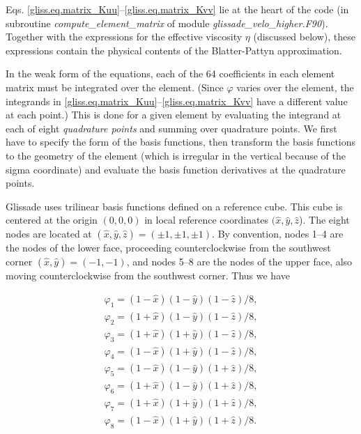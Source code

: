 Eqs. \eqref{gliss.eq.matrix_Kuu}--\eqref{gliss.eq.matrix_Kvv} lie at the heart of the code 
(in subroutine \textit{compute\_element\_matrix} of module \textit{glissade\_velo\_higher.F90}).
Together with the expressions for the effective viscosity $\eta$ (discussed below),
these expressions contain the physical contents of the Blatter-Pattyn approximation. 

In the weak form of the equations, each of the 64 coefficients in each
element matrix must be integrated over the element.  (Since $\varphi$ varies over the element,
the integrands in \eqref{gliss.eq.matrix_Kuu}--\eqref{gliss.eq.matrix_Kvv} 
have a different value at each point.)  
This is done for a given element by evaluating the integrand at each of 
eight \textit{quadrature points} and summing over quadrature points.
We first have to specify the form of the basis functions, then transform the basis functions to
the geometry of the element (which is irregular in the vertical because of the sigma
coordinate) and evaluate the basis function derivatives at the quadrature points.

Glissade uses trilinear basis functions defined on a reference cube.  
This cube is centered at the origin $(0,0,0)$ in local reference coordinates 
$(\hat{x}, \hat{y}, \hat{z}$). 
The eight nodes are located at $(\hat{x}, \hat{y}, \hat{z}) = (\pm 1, \pm 1, \pm 1)$.
By convention, nodes 1--4 are the nodes of the lower face, proceeding counterclockwise
from the southwest corner $(\hat{x}, \hat{y}) = (-1, -1)$, and nodes 5--8 are the nodes
of the upper face, also moving counterclockwise from the southwest corner.
Thus we have

\begin{equation}
  \label{gliss.eq.basis_functions}
  \begin{matrix}
    {{\varphi }_{1}}=(1-\hat{x})(1-\hat{y})(1-\hat{z})/8,  \\[3pt]
    {{\varphi }_{2}}=(1+\hat{x})(1-\hat{y})(1-\hat{z})/8,  \\[3pt]
    {{\varphi }_{3}}=(1+\hat{x})(1+\hat{y})(1-\hat{z})/8,  \\[3pt]
    {{\varphi }_{4}}=(1-\hat{x})(1+\hat{y})(1-\hat{z})/8,  \\[3pt]
    {{\varphi }_{5}}=(1-\hat{x})(1-\hat{y})(1+\hat{z})/8,  \\[3pt]
    {{\varphi }_{6}}=(1+\hat{x})(1-\hat{y})(1+\hat{z})/8,  \\[3pt]
    {{\varphi }_{7}}=(1+\hat{x})(1+\hat{y})(1+\hat{z})/8,  \\[3pt]
    {{\varphi }_{8}}=(1-\hat{x})(1+\hat{y})(1+\hat{z})/8.  \\
  \end{matrix}
\end{equation} 

